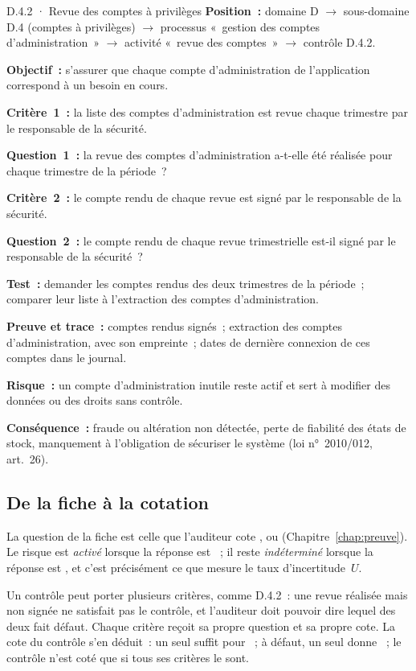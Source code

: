 \begin{boxobjet}{D.4.2 · Revue des comptes à privilèges}
\textbf{Position~:} domaine D $\rightarrow$ sous-domaine D.4 (comptes à
privilèges) $\rightarrow$ processus «~gestion des comptes d'administration~»
$\rightarrow$ activité «~revue des comptes~» $\rightarrow$ contrôle D.4.2.

\textbf{Objectif~:} s'assurer que chaque compte d'administration de
l'application correspond à un besoin en cours.

\textbf{Critère~1~:} la liste des comptes d'administration est revue chaque
trimestre par le responsable de la sécurité.

\textbf{Question~1~:} la revue des comptes d'administration a-t-elle été
réalisée pour chaque trimestre de la période~?

\textbf{Critère~2~:} le compte rendu de chaque revue est signé par le
responsable de la sécurité.

\textbf{Question~2~:} le compte rendu de chaque revue trimestrielle est-il
signé par le responsable de la sécurité~?

\textbf{Test~:} demander les comptes rendus des deux trimestres de la
période~; comparer leur liste à l'extraction des comptes d'administration.

\textbf{Preuve et trace~:} comptes rendus signés~; extraction des comptes
d'administration, avec son empreinte~; dates de dernière connexion de ces
comptes dans le journal.

\textbf{Risque~:} un compte d'administration inutile reste actif et sert à
modifier des données ou des droits sans contrôle.

\textbf{Conséquence~:} fraude ou altération non détectée, perte de fiabilité
des états de stock, manquement à l'obligation de sécuriser le système
(loi n°~2010/012, art.~26).
\end{boxobjet}

\subsection{De la fiche à la cotation}

La question de la fiche est celle que l'auditeur cote \OUI{}, \NON{} ou
\NEK{} (Chapitre~\ref{chap:preuve}). Le risque est \emph{activé} lorsque la
réponse est \NON{}~; il reste \emph{indéterminé} lorsque la réponse est
\NEK{}, et c'est précisément ce que mesure le taux d'incertitude~$U$.

Un contrôle peut porter plusieurs critères, comme D.4.2~: une revue
réalisée mais non signée ne satisfait pas le contrôle, et l'auditeur doit
pouvoir dire lequel des deux fait défaut. Chaque critère reçoit sa propre
question et sa propre cote. La cote du contrôle s'en déduit~: un seul
\NON{} suffit pour \NON{}~; à défaut, un seul \NEK{} donne \NEK{}~; le
contrôle n'est coté \OUI{} que si tous ses critères le sont.

